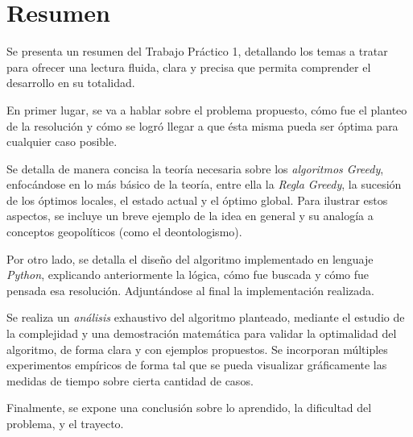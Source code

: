 \vspace*{1.5cm}
\section{Resumen}

Se presenta un resumen del Trabajo Práctico 1, detallando los temas a tratar para ofrecer una lectura fluida, clara y precisa que permita comprender el desarrollo en su totalidad.

En primer lugar, se va a hablar sobre el problema propuesto, cómo fue el planteo de la resolución y cómo se logró llegar a que ésta misma pueda ser óptima para cualquier caso posible.

Se detalla de manera concisa la teoría necesaria sobre los \textit{algoritmos Greedy}, enfocándose en lo más básico de la teoría, entre ella la \textit{Regla Greedy}, la sucesión de los óptimos locales, el estado actual y el óptimo global. Para ilustrar estos aspectos, se incluye un breve ejemplo de la idea en general y su analogía a conceptos geopolíticos (como el deontologismo).

Por otro lado, se detalla el diseño del algoritmo implementado en lenguaje \textit{Python}, explicando anteriormente la lógica, cómo fue buscada y cómo fue pensada esa resolución. Adjuntándose al final la implementación realizada.

Se realiza un \textit{análisis} exhaustivo del algoritmo planteado, mediante el estudio de la complejidad y una demostración matemática para validar la optimalidad del algoritmo, de forma clara y con ejemplos propuestos. Se incorporan múltiples experimentos empíricos de forma tal que se pueda visualizar gráficamente las medidas de tiempo sobre cierta cantidad de casos.

Finalmente, se expone una conclusión sobre lo aprendido, la dificultad del problema, y el trayecto.
